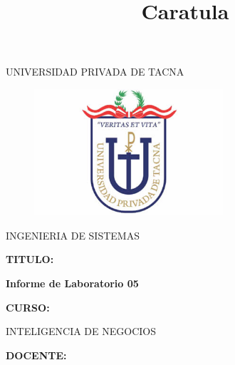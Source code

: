 \documentclass[12pt,letterpaper]{article}
\begin{document}
%


\title{Caratula}

\begin{titlepage}
\begin{center}
\large{UNIVERSIDAD PRIVADA DE TACNA}\\
\vspace*{-0.025in}
\begin{figure}[htb]
\begin{center}
\includegraphics[width=7cm]{./images/logo}
\end{center}
\end{figure}
\vspace*{0.15in}
INGENIERIA DE SISTEMAS  \\

\vspace*{0.3in}
\begin{large}
\textbf{TITULO:} \\
\end{large}

\vspace*{0.1in}
\begin{Large}
\textbf{Informe de Laboratorio 05} \\

\end{Large}

\vspace*{0.3in}
\begin{Large}
\textbf{CURSO:} \\
\end{Large}

\vspace*{0.1in}
\begin{large}
INTELIGENCIA DE NEGOCIOS\\
\end{large}

\vspace*{0.3in}
\begin{Large}
\textbf{DOCENTE:} \\
\end{Large}


\end{center}
\end{titlepage}
\end{document}

